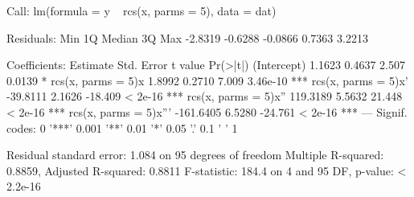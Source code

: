 \begin{Schunk}
\begin{Soutput}
Call:
lm(formula = y ~ rcs(x, parms = 5), data = dat)

Residuals:
    Min      1Q  Median      3Q     Max 
-2.8319 -0.6288 -0.0866  0.7363  3.2213 

Coefficients:
                       Estimate Std. Error t value Pr(>|t|)    
(Intercept)              1.1623     0.4637   2.507   0.0139 *  
rcs(x, parms = 5)x       1.8992     0.2710   7.009 3.46e-10 ***
rcs(x, parms = 5)x'    -39.8111     2.1626 -18.409  < 2e-16 ***
rcs(x, parms = 5)x''   119.3189     5.5632  21.448  < 2e-16 ***
rcs(x, parms = 5)x''' -161.6405     6.5280 -24.761  < 2e-16 ***
---
Signif. codes:  0 '***' 0.001 '**' 0.01 '*' 0.05 '.' 0.1 ' ' 1

Residual standard error: 1.084 on 95 degrees of freedom
Multiple R-squared:  0.8859,	Adjusted R-squared:  0.8811 
F-statistic: 184.4 on 4 and 95 DF,  p-value: < 2.2e-16
\end{Soutput}
\end{Schunk}
